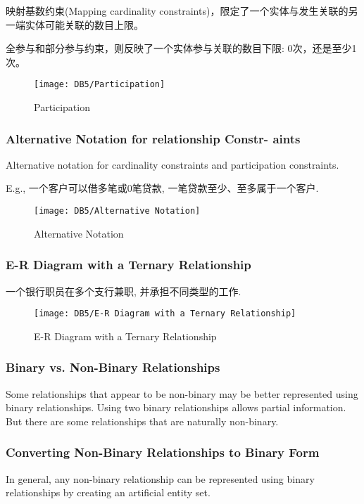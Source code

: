 映射基数约束(Mapping cardinality constraints)，限定了一个实体与发生关联的另一端实体可能关联的数目上限。

全参与和部分参与约束，则反映了一个实体参与关联的数目下限: 0次，还是至少1次。

\begin{figure}[H]
    \centering
    \texttt{[image: DB5/Participation]}
    \caption{Participation}
\end{figure}


\subsubsection[Alternative Notation for relationship Constraints]{Alternative Notation for relationship Constr- aints}
Alternative notation for cardinality constraints and participation constraints.

E.g., 一个客户可以借多笔或0笔贷款, 一笔贷款至少、至多属于一个客户. 

\begin{figure}[H]
    \centering
    \texttt{[image: DB5/Alternative Notation]}
    \caption{Alternative Notation}
\end{figure}


\subsubsection{E-R Diagram with a Ternary Relationship}
一个银行职员在多个支行兼职, 并承担不同类型的工作. 
\begin{figure}[H]
    \centering
    \texttt{[image: DB5/E-R Diagram with a Ternary Relationship]}
    \caption{E-R Diagram with a Ternary Relationship}
\end{figure}


\subsubsection{Binary vs. Non-Binary Relationships}
Some relationships that appear to be non-binary may be better represented using binary relationships. Using two binary relationships allows partial information. But there are some relationships that are naturally non-binary. 

\subsubsection[Converting Non-Binary Relationsh- ips to Binary Form]{Converting Non-Binary Relationships to Binary Form}
In general, any non-binary relationship can be represented using binary relationships by creating an artificial entity set. 

